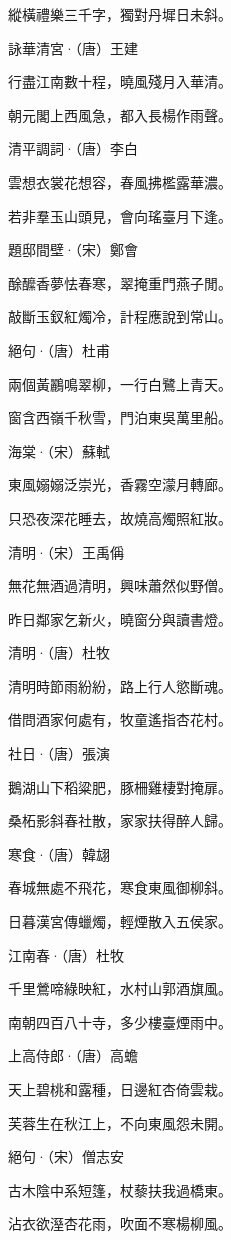 \documentclass[12pt,a4paper]{ctexbook}
\begin{document}
縱橫禮樂三千字，獨對丹墀日未斜。\par
詠華清宮·（唐）王建\par
行盡江南數十程，曉風殘月入華清。\par
朝元閣上西風急，都入長楊作雨聲。\par
清平調詞·（唐）李白\par
雲想衣裳花想容，春風拂檻露華濃。\par
若非羣玉山頭見，會向瑤臺月下逢。\par
題邸間壁·（宋）鄭會\par
酴醿香夢怯春寒，翠掩重門燕子閒。\par
敲斷玉釵紅燭冷，計程應說到常山。\par
絕句·（唐）杜甫\par
兩個黃鸝鳴翠柳，一行白鷺上青天。\par
窗含西嶺千秋雪，門泊東吳萬里船。\par
海棠·（宋）蘇軾\par
東風嫋嫋泛崇光，香霧空濛月轉廊。\par
只恐夜深花睡去，故燒高燭照紅妝。\par
清明·（宋）王禹偁\par
無花無酒過清明，興味蕭然似野僧。\par
昨日鄰家乞新火，曉窗分與讀書燈。\par
清明·（唐）杜牧\par
清明時節雨紛紛，路上行人慾斷魂。\par
借問酒家何處有，牧童遙指杏花村。\par
社日·（唐）張演\par
鵝湖山下稻粱肥，豚柵雞棲對掩扉。\par
桑柘影斜春社散，家家扶得醉人歸。\par
寒食·（唐）韓翃\par
春城無處不飛花，寒食東風御柳斜。\par
日暮漢宮傳蠟燭，輕煙散入五侯家。\par
江南春·（唐）杜牧\par
千里鶯啼綠映紅，水村山郭酒旗風。\par
南朝四百八十寺，多少樓臺煙雨中。\par
上高侍郎·（唐）高蟾\par
天上碧桃和露種，日邊紅杏倚雲栽。\par
芙蓉生在秋江上，不向東風怨未開。\par
絕句·（宋）僧志安\par
古木陰中系短篷，杖藜扶我過橋東。\par
沾衣欲溼杏花雨，吹面不寒楊柳風。\par
\end{document}
